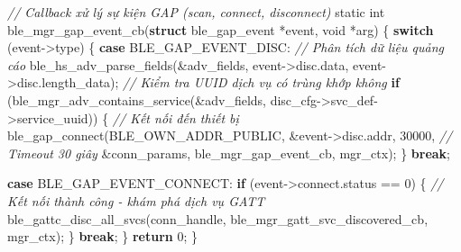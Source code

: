 \documentclass[a4paper]{extarticle}
\newenvironment{Shaded}{}{}
\newcommand{\CommentTok}[1]{\textcolor[rgb]{0.38,0.63,0.69}{\textit{#1}}}
\newcommand{\ControlFlowTok}[1]{\textcolor[rgb]{0.00,0.44,0.13}{\textbf{#1}}}
\newcommand{\DataTypeTok}[1]{\textcolor[rgb]{0.56,0.13,0.00}{#1}}
\newcommand{\DecValTok}[1]{\textcolor[rgb]{0.25,0.63,0.44}{#1}}
\newcommand{\KeywordTok}[1]{\textcolor[rgb]{0.00,0.44,0.13}{\textbf{#1}}}
\newcommand{\NormalTok}[1]{#1}
\newcommand{\OperatorTok}[1]{\textcolor[rgb]{0.40,0.40,0.40}{#1}}
\begin{document}
\begin{Shaded}
\begin{Highlighting}[]
\CommentTok{// Callback xử lý sự kiện GAP (scan, connect, disconnect)}
\DataTypeTok{static} \DataTypeTok{int}\NormalTok{ ble\_mgr\_gap\_event\_cb}\OperatorTok{(}\KeywordTok{struct}\NormalTok{ ble\_gap\_event }\OperatorTok{*}\NormalTok{event}\OperatorTok{,} \DataTypeTok{void} \OperatorTok{*}\NormalTok{arg}\OperatorTok{)}
\OperatorTok{\{}
    \ControlFlowTok{switch} \OperatorTok{(}\NormalTok{event}\OperatorTok{{-}\textgreater{}}\NormalTok{type}\OperatorTok{)} \OperatorTok{\{}
    \ControlFlowTok{case}\NormalTok{ BLE\_GAP\_EVENT\_DISC}\OperatorTok{:}
        \CommentTok{// Phân tích dữ liệu quảng cáo}
\NormalTok{        ble\_hs\_adv\_parse\_fields}\OperatorTok{(\&}\NormalTok{adv\_fields}\OperatorTok{,}
\NormalTok{                                event}\OperatorTok{{-}\textgreater{}}\NormalTok{disc}\OperatorTok{.}\NormalTok{data}\OperatorTok{,}
\NormalTok{                                event}\OperatorTok{{-}\textgreater{}}\NormalTok{disc}\OperatorTok{.}\NormalTok{length\_data}\OperatorTok{);}
        \CommentTok{// Kiểm tra UUID dịch vụ có trùng khớp không}
        \ControlFlowTok{if} \OperatorTok{(}\NormalTok{ble\_mgr\_adv\_contains\_service}\OperatorTok{(\&}\NormalTok{adv\_fields}\OperatorTok{,}
\NormalTok{                                          disc\_cfg}\OperatorTok{{-}\textgreater{}}\NormalTok{svc\_def}\OperatorTok{{-}\textgreater{}}\NormalTok{service\_uuid}\OperatorTok{))} \OperatorTok{\{}
            \CommentTok{// Kết nối đến thiết bị}
\NormalTok{            ble\_gap\_connect}\OperatorTok{(}\NormalTok{BLE\_OWN\_ADDR\_PUBLIC}\OperatorTok{,}
                            \OperatorTok{\&}\NormalTok{event}\OperatorTok{{-}\textgreater{}}\NormalTok{disc}\OperatorTok{.}\NormalTok{addr}\OperatorTok{,}
                            \DecValTok{30000}\OperatorTok{,}           \CommentTok{// Timeout 30 giây}
                            \OperatorTok{\&}\NormalTok{conn\_params}\OperatorTok{,}
\NormalTok{                            ble\_mgr\_gap\_event\_cb}\OperatorTok{,}\NormalTok{ mgr\_ctx}\OperatorTok{);}
        \OperatorTok{\}}
        \ControlFlowTok{break}\OperatorTok{;}

    \ControlFlowTok{case}\NormalTok{ BLE\_GAP\_EVENT\_CONNECT}\OperatorTok{:}
        \ControlFlowTok{if} \OperatorTok{(}\NormalTok{event}\OperatorTok{{-}\textgreater{}}\NormalTok{connect}\OperatorTok{.}\NormalTok{status }\OperatorTok{==} \DecValTok{0}\OperatorTok{)} \OperatorTok{\{}
            \CommentTok{// Kết nối thành công {-} khám phá dịch vụ GATT}
\NormalTok{            ble\_gattc\_disc\_all\_svcs}\OperatorTok{(}\NormalTok{conn\_handle}\OperatorTok{,}
\NormalTok{                                     ble\_mgr\_gatt\_svc\_discovered\_cb}\OperatorTok{,}
\NormalTok{                                     mgr\_ctx}\OperatorTok{);}
        \OperatorTok{\}}
        \ControlFlowTok{break}\OperatorTok{;}
    \OperatorTok{\}}
    \ControlFlowTok{return} \DecValTok{0}\OperatorTok{;}
\OperatorTok{\}}
\end{Highlighting}
\end{Shaded}
\end{document}
